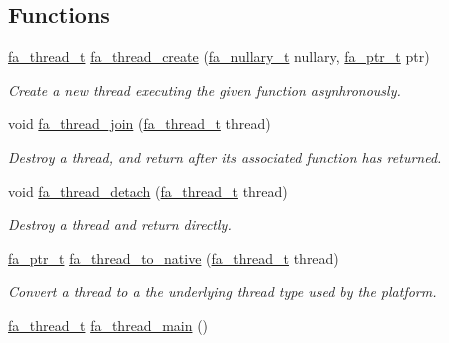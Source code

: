 \subsection*{Functions}
\begin{DoxyCompactItemize}
\item 
\hyperlink{group___fa_thread_gaec6debf84c8113cb354a7352b4e17abd}{fa\-\_\-thread\-\_\-t} \hyperlink{group___fa_thread_ga7edcae8080b6df6a8258b1dd20f9bf12}{fa\-\_\-thread\-\_\-create} (\hyperlink{group___fa_ga43b940a9294fd58a54087ef0b416e479}{fa\-\_\-nullary\-\_\-t} nullary, \hyperlink{group___fa_ga915ddeae99ad7568b273d2b876425197}{fa\-\_\-ptr\-\_\-t} ptr)
\begin{DoxyCompactList}\small\item\em Create a new thread executing the given function asynhronously. \end{DoxyCompactList}\item 
void \hyperlink{group___fa_thread_gade25ae0c15b35fe0c2761b101a8c0d5f}{fa\-\_\-thread\-\_\-join} (\hyperlink{group___fa_thread_gaec6debf84c8113cb354a7352b4e17abd}{fa\-\_\-thread\-\_\-t} thread)
\begin{DoxyCompactList}\small\item\em Destroy a thread, and return after its associated function has returned. \end{DoxyCompactList}\item 
void \hyperlink{group___fa_thread_ga9686acdb9cd173dd1e5928b129059ca9}{fa\-\_\-thread\-\_\-detach} (\hyperlink{group___fa_thread_gaec6debf84c8113cb354a7352b4e17abd}{fa\-\_\-thread\-\_\-t} thread)
\begin{DoxyCompactList}\small\item\em Destroy a thread and return directly. \end{DoxyCompactList}\item 
\hyperlink{group___fa_ga915ddeae99ad7568b273d2b876425197}{fa\-\_\-ptr\-\_\-t} \hyperlink{group___fa_thread_gae656f053fe04a6ce55e28fb912e03d48}{fa\-\_\-thread\-\_\-to\-\_\-native} (\hyperlink{group___fa_thread_gaec6debf84c8113cb354a7352b4e17abd}{fa\-\_\-thread\-\_\-t} thread)
\begin{DoxyCompactList}\small\item\em Convert a thread to a the underlying thread type used by the platform. \end{DoxyCompactList}\item 
\hyperlink{group___fa_thread_gaec6debf84c8113cb354a7352b4e17abd}{fa\-\_\-thread\-\_\-t} \hyperlink{group___fa_thread_ga9e6021c99ac7040340ccf57c9d833895}{fa\-\_\-thread\-\_\-main} ()

\end{DoxyCompactItemize}

